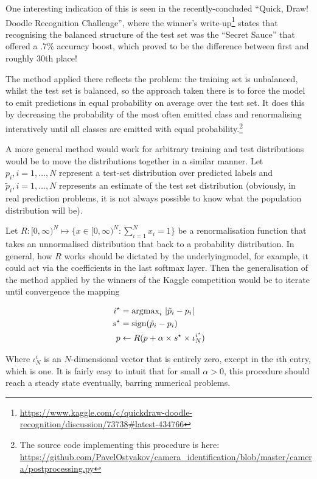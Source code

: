 \documentclass[10pt,twocolumn,letterpaper]{article}
\begin{document}
One interesting indication of this is seen in the recently-concluded ``Quick, Draw! Doodle Recognition Challenge'', where the winner's write-up\footnote{\url{https://www.kaggle.com/c/quickdraw-doodle-recognition/discussion/73738\#latest-434766}} states that recognising the balanced structure of the test set was the ``Secret Sauce'' that offered a .7\% accuracy boost, which proved to be the difference between first and roughly 30th place!

The method applied there reflects the problem: the training set is unbalanced, whilst the test set is balanced, so the approach taken there is to force the model to emit predictions in equal probability on average over the test set. It does this by decreasing the probability of the most often emitted class and renormalising interatively until all classes are emitted with equal probability.\footnote{The source code implementing this procedure is here: \url{https://github.com/PavelOstyakov/camera_identification/blob/master/camera/postprocessing.py}}

A more general method would work for arbitrary training and test distributions would be to move the distributions together in a similar manner. Let $p_i, i = 1, \hdots, N$ represent a test-set distribution over predicted labels and $\tilde{p}_i, i = 1, \hdots, N$ represents an estimate of the test set distribution (obviously, in real prediction problems, it is not always possible to know what the population distribution will be).

Let $R: [0, \infty)^N \mapsto \{x \in [0, \infty)^N : \sum_{i=1}^N x_i = 1 \}$ be a renormalisation function that takes an unnormalised distribution that back to a probability distribution. In general, how $R$ works should be dictated by the underlyingmodel, for example, it could act via the coefficients in the last softmax layer. Then the generalisation of the method applied by the winners of the Kaggle competition would be to iterate until convergence the mapping

\begin{align*}
i^\star &= \textnormal{argmax}_i\ |\tilde{p}_i - p_i| \\
s^\star &= \textnormal{sign}(\tilde{p}_i - p_i) \\
p &\leftarrow R(p + \alpha \times s^\star \times \iota_N^{i^\star})
\end{align*}

Where $\iota^i_N$ is an $N$-dimensional vector that is entirely zero, except in the $i$th entry, which is one. It is fairly easy to intuit that for small $\alpha > 0$, this procedure should reach a steady state eventually, barring numerical problems. 
\end{document}
